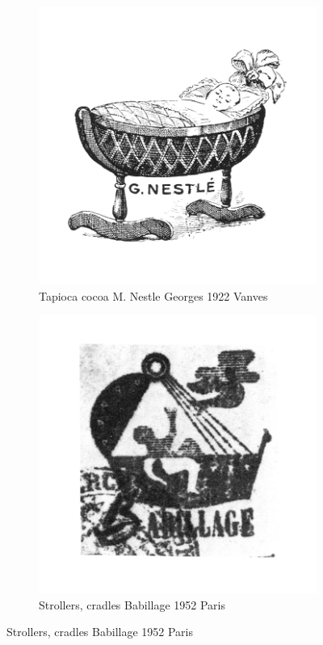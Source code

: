 \begin{figure}[h]
  \begin{subfigure}{.45\textwidth}
    \centering
    \includegraphics[width=.5\linewidth]{images/supplement/trademarks/french/20_22}
    \caption{Tapioca cocoa M. Nestle Georges 1922 Vanves}
    \label{fig:trademarks:french:20.22}
  \end{subfigure}\hfill
  \begin{subfigure}{.45\textwidth}
    \centering
    \includegraphics[width=.5\linewidth]{images/supplement/trademarks/french/20_23}
    \caption{Strollers, cradles Babillage 1952 Paris}
    \label{fig:trademarks:french:20.23}
  \end{subfigure}


\end{figure}
